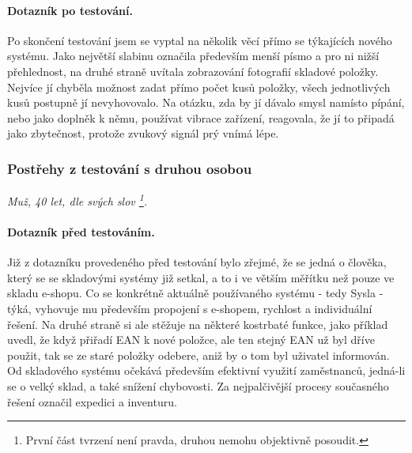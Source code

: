 \paragraph{Dotazník po testování.} Po skončení testování jsem se vyptal na několik věcí přímo se týkajících nového systému. Jako největší slabinu označila především menší písmo a pro ni nižší přehlednost, na druhé straně uvítala zobrazování fotografií skladové položky. Nejvíce jí chyběla možnost zadat přímo počet kusů položky,  všech jednotlivých kusů postupně jí nevyhovovalo. Na otázku, zda by jí dávalo smysl namísto pípání, nebo jako doplněk k němu, používat vibrace zařízení, reagovala, že jí to připadá jako zbytečnost, protože zvukový signál prý vnímá lépe.


\subsubsection{Postřehy z testování s druhou osobou}
\emph{Muž, 40 let, dle svých slov \footnote{První část tvrzení není pravda, druhou nemohu objektivně posoudit.}.}

\paragraph{Dotazník před testováním.} Již z dotazníku provedeného před testování bylo zřejmé, že se jedná o člověka, který se se skladovými systémy již setkal, a to i ve větším měřítku než pouze ve skladu e-shopu. Co se konkrétně aktuálně používaného systému - tedy Sysla - týká, vyhovuje mu především propojení s e-shopem, rychlost a individuální řešení. Na druhé straně si ale stěžuje na některé kostrbaté funkce, jako příklad uvedl, že když přiřadí EAN k nové položce, ale ten stejný EAN už byl dříve použit, tak se ze staré položky odebere, aniž by o tom byl uživatel informován. Od skladového systému očekává především efektivní využití zaměstnanců, jedná-li se o velký sklad, a také snížení chybovosti. Za nejpalčivější procesy současného řešení označil expedici a inventuru.

